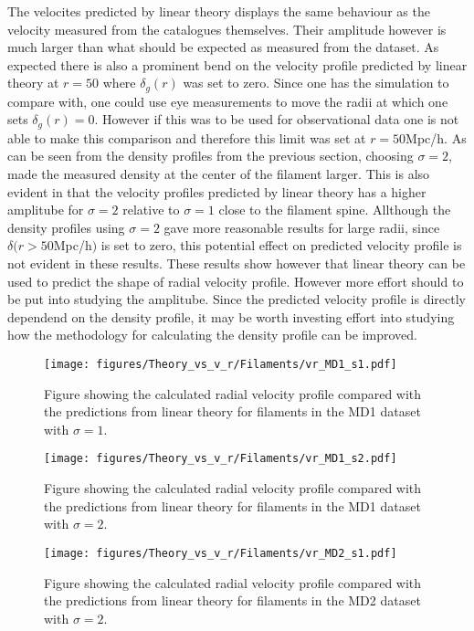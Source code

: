 The velocites predicted by linear theory displays the same behaviour as the velocity measured from the catalogues themselves. Their amplitude however is much larger than what should be expected as measured from the dataset. As expected there is also a prominent bend on the velocity profile predicted by linear theory at $r=50$ where $\delta_g(r)$ was set to zero. Since one has the simulation to compare with, one could use eye measurements to move the radii at which one sets $\delta_g(r)=0$. However if this was to be used for observational data one is not able to make this comparison and therefore this limit was set at $r=50$Mpc/h. As can be seen from the density profiles from the previous section, choosing $\sigma=2$, made the measured density at the center of the filament larger. This is also evident in that the velocity profiles predicted by linear theory has a higher amplitube for $\sigma=2$ relative to $\sigma=1$ close to the filament spine. Allthough the density profiles using $\sigma=2$ gave more reasonable results for large radii, since $\delta(r>50$Mpc/h$)$ is set to zero, this potential effect on predicted velocity profile is not evident in these results. These results show however that linear theory can be used to predict the shape of radial velocity profile. However more effort should to be put into studying the amplitube. Since the predicted velocity profile is directly dependend on the density profile, it may be worth investing effort into studying how the methodology for calculating the density profile can be improved. 


\begin{figure}[H]
    \texttt{[image: figures/Theory\_vs\_v\_r/Filaments/vr\_MD1\_s1.pdf]}
    \caption{Figure showing the calculated radial velocity profile compared with the predictions from linear theory for filaments in the MD1 dataset with $\sigma=1$.}
    \label{fig:filvrMD1s1}
\end{figure}

\begin{figure}[H]
    \texttt{[image: figures/Theory\_vs\_v\_r/Filaments/vr\_MD1\_s2.pdf]}
    \caption{Figure showing the calculated radial velocity profile compared with the predictions from linear theory for filaments in the MD1 dataset with $\sigma=2$.}
    \label{fig:filvrMD1s2}
\end{figure}

\begin{figure}[H]
    \texttt{[image: figures/Theory\_vs\_v\_r/Filaments/vr\_MD2\_s1.pdf]}
    \caption{Figure showing the calculated radial velocity profile compared with the predictions from linear theory for filaments in the MD2 dataset with $\sigma=2$.}
    \label{fig:filvrMD2s1}
\end{figure}

